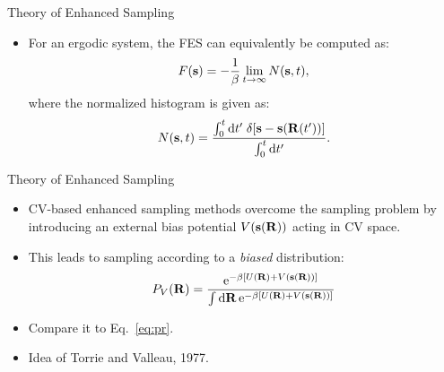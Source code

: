 \documentclass[10pt]{beamer}
\begin{document}
\begin{frame}{Theory of Enhanced Sampling}
\begin{itemize}
\setlength\itemsep{1em}
  \item For an ergodic system, the FES can equivalently be computed as:
  \begin{equation}
    F({\bf s}) = -\frac{1}{\beta} \lim_{t\rightarrow\infty} N({\bf s}, t),
  \end{equation}
  where the normalized histogram is given as:
  \begin{equation}
    N({\bf s},t) = \frac{\int_0^t \mathrm{d} t'\; \delta[{\bf s}-{\bf s}({\bf R}(t'))]}{\int_0^t \mathrm{d} t'}.
  \end{equation}
\end{itemize}
\end{frame}

\begin{frame}{Theory of Enhanced Sampling}
\begin{itemize}
\setlength\itemsep{1em}
  \item CV-based enhanced sampling methods overcome the sampling problem by introducing an external bias potential $V({\bf s}({\bf R}))$ acting in CV space.

  \item This leads to sampling according to a \textit{biased} distribution:
  \begin{equation}
    P_{V}(\mathbf{R}) = \frac{\mathrm{e}^{-\beta \left[U(\mathbf{R})+V(\mathbf{s}(\mathbf{R})) \right]}}{\int \mathrm{d}\mathbf{R} \,\mathrm{e}^{-\beta \left[U(\mathbf{R})+V(\mathbf{s}(\mathbf{R})) \right]}}
  \end{equation}

  \item Compare it to Eq.~\ref{eq:pr}.

  \item Idea of Torrie and Valleau, 1977.
\end{itemize}
\end{frame}
\end{document}
